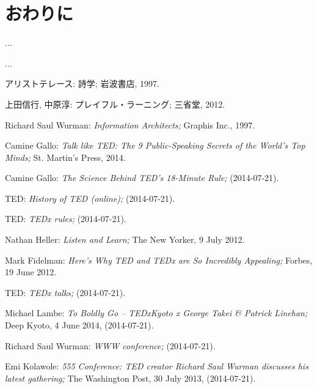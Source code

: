 \documentclass[submit,techreq,jkeyword,noauthor]{ipsj}
\begin{document}





\section{おわりに}

...

\begin{acknowledgment}
...
\end{acknowledgment}



\begin{thebibliography}{10}

アリストテレース: 詩学; 岩波書店, 1997.

上田信行, 中原淳: プレイフル・ラーニング; 三省堂, 2012.

Richard Saul Wurman: \textit{Information Architects;}
Graphis Inc., 1997.

Camine Gallo: \textit{Talk like TED: The 9 Public-Speaking Secrets of the World's Top Minds;}
St. Martin's Press, 2014.

Camine Gallo: \textit{The Science Behind TED's 18-Minute Rule;}
(2014-07-21).

TED: \textit{History of TED (online);}
 (2014-07-21).

TED: \textit{TEDx rules;}
(2014-07-21).

Nathan Heller: \textit{Listen and Learn;}
The New Yorker, 9 July 2012.

Mark Fidelman: \textit{Here's Why TED and TEDx are So Incredibly Appealing;}
Forbes, 19 June 2012.

TED: \textit{TEDx talks;}
(2014-07-21).

Michael Lambe: \textit{To Boldly Go – TEDxKyoto x George Takei \& Patrick Linehan;}
Deep Kyoto, 4 June 2014,
 (2014-07-21).

Richard Saul Wurman: \textit{WWW conference;}
 (2014-07-21).

Emi Kolawole: \textit{555 Conference: TED creator Richard Saul Wurman discusses his latest gathering;}
The Washington Post, 30 July 2013,
(2014-07-21).

\end{thebibliography}
\end{document}

